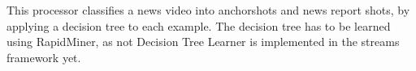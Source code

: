 This processor classifies a news video into anchorshots and news report shots, by applying a decision tree to each example. The decision tree has to be learned using RapidMiner, as not Decision Tree Learner is implemented in the streams framework yet.